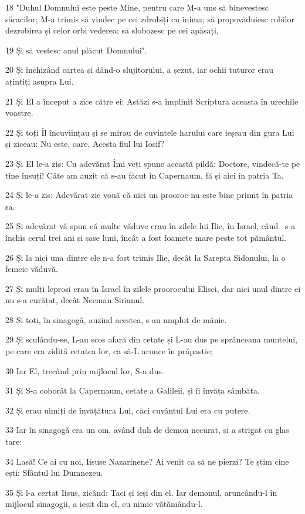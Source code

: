 \par 18 "Duhul Domnului este peste Mine, pentru care M-a uns să binevestesc săracilor; M-a trimis să vindec pe cei zdrobiți cu inima; să propovăduiesc robilor dezrobirea și celor orbi vederea; să slobozesc pe cei apăsați,
\par 19 Și să vestesc anul plăcut Domnului".
\par 20 Și închizând cartea și dând-o slujitorului, a șezut, iar ochii tuturor erau ațintiți asupra Lui.
\par 21 Și El a început a zice către ei: Astăzi s-a împlinit Scriptura aceasta în urechile voastre.
\par 22 Și toți Îl încuviințau și se mirau de cuvintele harului care ieșeau din gura Lui și ziceau: Nu este, oare, Acesta fiul lui Iosif?
\par 23 Și El le-a zis: Cu adevărat Îmi veți spune această pildă: Doctore, vindecă-te pe tine însuți! Câte am auzit că s-au făcut în Capernaum, fă și aici în patria Ta.
\par 24 Și le-a zis: Adevărat zic vouă că nici un prooroc nu este bine primit în patria sa.
\par 25 Și adevărat vă spun că multe văduve erau în zilele lui Ilie, în Israel, când  s-a închis cerul trei ani și șase luni, încât a fost foamete mare peste tot pământul.
\par 26 Și la nici una dintre ele n-a fost trimis Ilie, decât la Sarepta Sidonului, la o femeie văduvă.
\par 27 Și mulți leproși erau în Israel în zilele proorocului Elisei, dar nici unul dintre ei nu s-a curățat, decât Neeman Sirianul.
\par 28 Și toți, în sinagogă, auzind acestea, s-au umplut de mânie.
\par 29 Și sculându-se, L-au scos afară din cetate și L-au dus pe sprânceana muntelui, pe care era zidită cetatea lor, ca să-L arunce în prăpastie;
\par 30 Iar El, trecând prin mijlocul lor, S-a dus.
\par 31 Și S-a coborât la Capernaum, cetate a Galileii, și îi învăța sâmbăta.
\par 32 Și erau uimiți de învățătura Lui, căci cuvântul Lui era cu putere.
\par 33 Iar în sinagogă era un om, având duh de demon necurat, și a strigat cu glas tare:
\par 34 Lasă! Ce ai cu noi, Iisuse Nazarinene? Ai venit ca să ne pierzi? Te știm cine ești: Sfântul lui Dumnezeu.
\par 35 Și l-a certat Iisus, zicând: Taci și ieși din el. Iar demonul, aruncându-l în mijlocul sinagogii, a ieșit din el, cu nimic vătămându-l.
